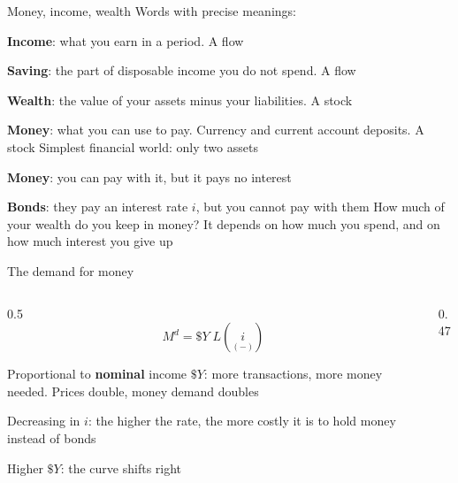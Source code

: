 \documentclass[aspectratio=169,xcolor=table]{beamer}
\begin{document}
\begin{frame}{Money, income, wealth}
\small
Words with precise meanings:
\bi
  \item \textbf{Income}: what you earn in a period. A flow
  \item \textbf{Saving}: the part of disposable income you do not spend. A flow
  \item \textbf{Wealth}: the value of your assets minus your liabilities. A stock
  \item \textbf{Money}: what you can use to pay. Currency and current account deposits. A stock
\ei
\vspace{0.1cm}
Simplest financial world: only two assets
\bi
  \item \textbf{Money}: you can pay with it, but it pays no interest
  \item \textbf{Bonds}: they pay an interest rate $i$, but you cannot pay with them
\ei
How much of your wealth do you keep in money? It depends on how much you spend, and on how much interest you give up
\end{frame}

\begin{frame}{The demand for money}
\begin{columns}[c]
\begin{column}{0.5\textwidth}
\small
\[
M^d = \$Y \; L(\underset{(-)}{i})
\]
\bi
  \item Proportional to \textbf{nominal} income $\$Y$: more transactions, more money needed. Prices double, money demand doubles
  \item Decreasing in $i$: the higher the rate, the more costly it is to hold money instead of bonds
  \item Higher $\$Y$: the curve shifts right
\ei
\end{column}
\begin{column}{0.47\textwidth}
\centering
{}
\end{column}
\end{columns}
\end{frame}
\end{document}
